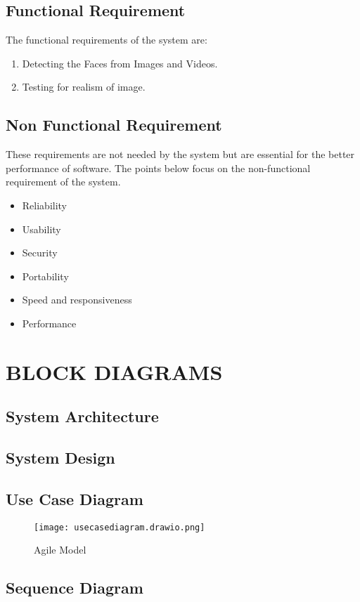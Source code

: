 \documentclass[12 pt]{article}
\begin{document}
\subsection{Functional Requirement}
The functional requirements of the system are:
\begin{enumerate}
    \item Detecting the Faces from Images and Videos.
    \item Testing for realism of image.
\end{enumerate}

\subsection{Non Functional Requirement}
\justify
These requirements are not needed by the system but are essential for the better
performance of software. The points below focus on the non-functional requirement of
the system.
\begin{itemize}
    \item Reliability
    \item   Usability
    \item   Security
    \item   Portability
    \item   Speed and responsiveness
    \item  Performance
\end{itemize}


\newpage

\section{BLOCK DIAGRAMS}
\subsection{System Architecture}
\newpage
\subsection{System Design}
\newpage
\subsection{Use Case Diagram}
\begin{figure}[h]
    \centering
    \texttt{[image: usecasediagram.drawio.png]}
    \caption{Agile Model}
\end{figure}
\newpage
\subsection{Sequence Diagram}
\newpage
\end{document}
